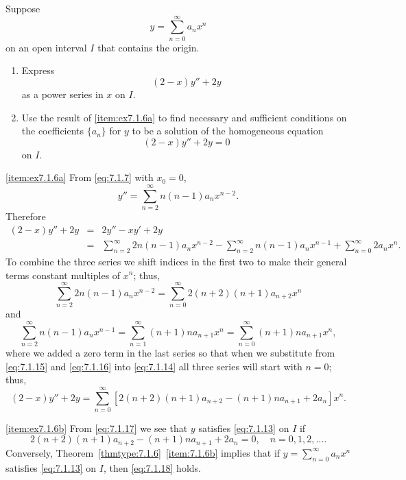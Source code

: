 \documentclass{ximera}
\begin{document}
\begin{example}\label{example:7.1.6}
Suppose
$$
y=\sum_{n=0}^\infty a_n x^n
$$
 on an open interval $I$ that contains the origin.
\begin{enumerate}
\item\label{item:ex7.1.6a} %
Express
$$
(2-x)y''+2y
$$
as a power series in $x$ on $I$.
\item\label{item:ex7.1.6b} %
Use the result of \ref{item:ex7.1.6a} to find necessary and sufficient conditions
on the coefficients $\{a_n\}$ for
 $y$ to be  a solution of the homogeneous equation
\begin{equation} \label{eq:7.1.13}
(2-x)y''+2y=0
\end{equation}
on $I$.
\end{enumerate}

\begin{explanation}
\ref{item:ex7.1.6a}
From \eqref{eq:7.1.7} with $x_0=0$,
$$
y''=\sum_{n=2}^\infty n(n-1)a_nx^{n-2}.
$$
Therefore
\begin{equation} \label{eq:7.1.14}
\begin{array}{rcl}
(2-x)y''+2y&=&2y''-xy'+2y\\
&=&\sum_{n=2}^\infty 2n(n-1)a_nx^{n-2}
-\sum_{n=2}^\infty n(n-1)a_nx^{n-1}
+\sum_{n=0}^\infty 2a_n x^n.
\end{array}
\end{equation}
To combine the three series we  shift indices in the first two to
make their general terms  constant multiples of $x^n$;   thus,
\begin{equation} \label{eq:7.1.15}
\sum_{n=2}^\infty
2n(n-1)a_nx^{n-2}=\sum_{n=0}^\infty2(n+2)(n+1)a_{n+2}x^n
\end{equation}
and
\begin{equation} \label{eq:7.1.16}
\sum_{n=2}^\infty n(n-1)a_nx^{n-1}=\sum_{n=1}^\infty(n+1)na_{n+1}x^n
=\sum_{n=0}^\infty(n+1)na_{n+1}x^n,
\end{equation}
where we added a zero term in the last series so that when we
substitute from \eqref{eq:7.1.15} and \eqref{eq:7.1.16} into \eqref{eq:7.1.14}
all three series will start with $n=0$;   thus,
\begin{equation} \label{eq:7.1.17}
(2-x)y''+2y=\sum_{n=0}^\infty
[2(n+2)(n+1)a_{n+2}-(n+1)na_{n+1}+2a_n]x^n.
\end{equation}

\ref{item:ex7.1.6b} From   \eqref{eq:7.1.17}
we see that $y$ satisfies \eqref{eq:7.1.13} on $I$ if
\begin{equation} \label{eq:7.1.18}
2(n+2)(n+1)a_{n+2}-(n+1)na_{n+1}+2a_n=0,\quad n=0,1,2, \dots.
\end{equation}
Conversely, Theorem~\ref{thmtype:7.1.6}~\ref{item:7.1.6b} implies that if
$y=\sum_{n=0}^\infty a_nx^n$
satisfies \eqref{eq:7.1.13} on $I$,  then \eqref{eq:7.1.18} holds.
\end{explanation}
\end{example}
\end{document}
